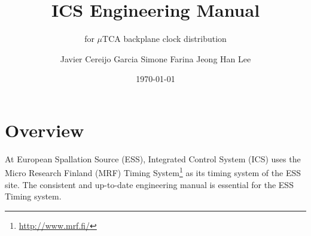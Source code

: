 \documentclass[11pt
  , a4paper
  , article
  , oneside
  , showtrims
]{memoir}
\begin{document}


\date{\today}




\title{ICS Engineering Manual}
\subtitle{for $\mu$TCA backplane clock distribution}
\author{Javier Cereijo Garcia \newline Simone Farina \newline Jeong Han Lee}



\showtrimson

\esstitle
\newpage
\tableofcontents
\newpage



\chapter{Overview}
At European Spallation Source (ESS), Integrated Control System (ICS) uses the Micro Research Finland (MRF) Timing System{\footnote{\url{http://www.mrf.fi/}}} as its timing system of the ESS site. The consistent and up-to-date engineering manual is essential for the ESS Timing system.
\end{document}
